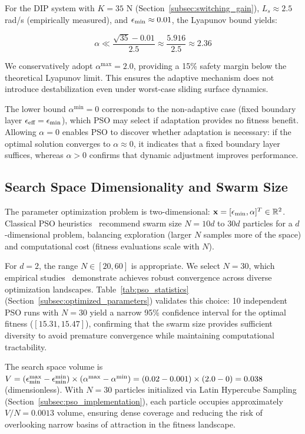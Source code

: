 For the DIP system with $K = 35$ N (Section~\ref{subsec:switching_gain}), $L_s \approx 2.5$ rad/s (empirically measured), and $\epsilon_{\min} \approx 0.01$, the Lyapunov bound yields:

\begin{equation}
\label{eq:alpha_numerical_bound}
\alpha \ll \frac{\sqrt{35} - 0.01}{2.5} \approx \frac{5.916}{2.5} \approx 2.36
\end{equation}

We conservatively adopt $\alpha^{\max} = 2.0$, providing a 15\% safety margin below the theoretical Lyapunov limit. This ensures the adaptive mechanism does not introduce destabilization even under worst-case sliding surface dynamics.

The lower bound $\alpha^{\min} = 0$ corresponds to the non-adaptive case (fixed boundary layer $\epsilon_{\text{eff}} = \epsilon_{\min}$), which PSO may select if adaptation provides no fitness benefit. Allowing $\alpha = 0$ enables PSO to discover whether adaptation is necessary: if the optimal solution converges to $\alpha \approx 0$, it indicates that a fixed boundary layer suffices, whereas $\alpha > 0$ confirms that dynamic adjustment improves performance.

\subsection{Search Space Dimensionality and Swarm Size}
\label{subsec:search_space}

The parameter optimization problem is two-dimensional: $\mathbf{x} = [\epsilon_{\min}, \alpha]^T \in \mathbb{R}^2$. Classical PSO heuristics~\cite{shi1998parameter} recommend swarm size $N = 10d$ to $30d$ particles for a $d$-dimensional problem, balancing exploration (larger $N$ samples more of the space) and computational cost (fitness evaluations scale with $N$).

For $d=2$, the range $N \in [20, 60]$ is appropriate. We select $N=30$, which empirical studies~\cite{eberhart2001swarm} demonstrate achieves robust convergence across diverse optimization landscapes. Table~\ref{tab:pso_statistics} (Section~\ref{subsec:optimized_parameters}) validates this choice: 10 independent PSO runs with $N=30$ yield a narrow 95\% confidence interval for the optimal fitness ($[15.31, 15.47]$), confirming that the swarm size provides sufficient diversity to avoid premature convergence while maintaining computational tractability.

The search space volume is $V = (\epsilon_{\min}^{\max} - \epsilon_{\min}^{\min}) \times (\alpha^{\max} - \alpha^{\min}) = (0.02 - 0.001) \times (2.0 - 0) = 0.038$ (dimensionless). With $N=30$ particles initialized via Latin Hypercube Sampling (Section~\ref{subsec:pso_implementation}), each particle occupies approximately $V/N = 0.0013$ volume, ensuring dense coverage and reducing the risk of overlooking narrow basins of attraction in the fitness landscape.

